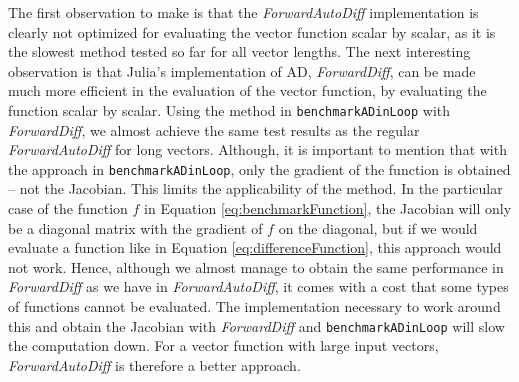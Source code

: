 The first observation to make is that the \textit{ForwardAutoDiff} implementation is clearly not optimized for evaluating the vector function scalar by scalar, as it is the slowest method tested so far for all vector lengths. The next interesting observation is that Julia's implementation of AD, \textit{ForwardDiff}, can be made much more efficient in the evaluation of the vector function, by evaluating the function scalar by scalar. Using the method in \texttt{benchmarkADinLoop} with \textit{ForwardDiff}, we almost achieve the same test results as the regular \textit{ForwardAutoDiff} for long vectors. Although, it is important to mention that with the approach in \texttt{benchmarkADinLoop}, only the gradient of the function is obtained -- not the Jacobian. This limits the applicability of the method. In the particular case of the function $f$ in Equation \eqref{eq:benchmarkFunction}, the Jacobian will only be a diagonal matrix with the gradient of $f$ on the diagonal, but if we would evaluate a function like in Equation \eqref{eq:differenceFunction}, this approach would not work. Hence, although we almost manage to obtain the same performance in \textit{ForwardDiff} as we have in \textit{ForwardAutoDiff}, it comes with a cost that some types of functions cannot be evaluated. The implementation necessary to work around this and obtain the Jacobian with \textit{ForwardDiff} and \texttt{benchmarkADinLoop} will slow the computation down. For a vector function with large input vectors, \textit{ForwardAutoDiff} is therefore a better approach. 

